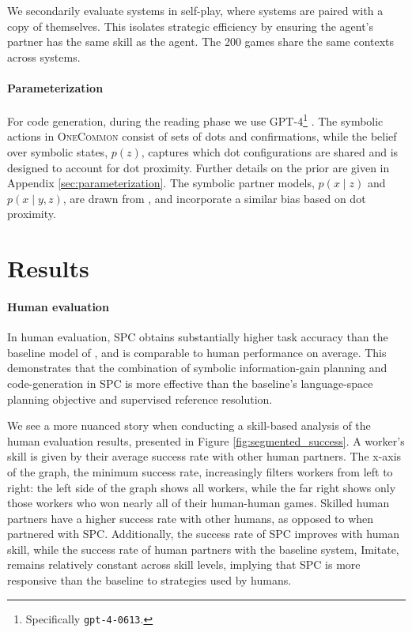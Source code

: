 \documentclass[11pt]{article}
\newcommand{\system}{SPC}
\begin{document}
We secondarily evaluate systems in self-play, where systems are paired with a copy of themselves. This isolates strategic efficiency by ensuring the agent's partner has the same skill as the agent. The 200 games share the same contexts across systems.


\paragraph{Parameterization}
For code generation, during the reading phase we use GPT-4\footnote{Specifically \texttt{gpt-4-0613}.} \citep{gpt4}.
The symbolic actions in \textsc{OneCommon} consist of sets of dots and confirmations, while the belief over symbolic states, $p(z)$,
captures which dot configurations are shared and is designed to account for dot proximity.
Further details on the prior are given in Appendix \ref{sec:parameterization}.
The symbolic partner models, $p(x\mid z)$ and $p(x\mid y,z)$, are drawn from \citet{ocp}, and incorporate a similar bias based on dot proximity.

\section{Results}

\paragraph{Human evaluation}
In human evaluation,
\system{} obtains substantially higher task accuracy than the baseline model of \citet{fried},
and is comparable to human performance on average. This demonstrates that the combination of symbolic information-gain planning and code-generation in \system{} is more effective than the baseline's language-space planning objective and supervised reference resolution.

We see a more nuanced story when conducting a skill-based analysis of the human evaluation results, presented in Figure \ref{fig:segmented_success}.
A worker's skill is given by their average success rate with other human partners.
The x-axis of the graph, the minimum success rate, increasingly filters workers from left to right:
the left side of the graph shows all workers, while the far right shows only those workers who won nearly all of their human-human games.
Skilled human partners have a higher success rate with other humans, as opposed to when partnered with \system{}.
Additionally, the success rate of \system{} improves with human skill, while the success rate of human partners with the baseline system, Imitate, remains relatively constant across skill levels, implying that \system{} is more responsive than the baseline to strategies used by humans.
\end{document}
